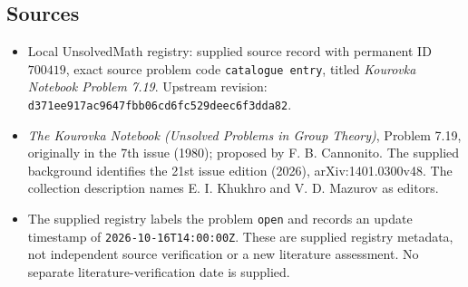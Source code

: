 \documentclass[11pt]{article}
\begin{document}
\subsection{Sources}
\begin{itemize}
\item Local UnsolvedMath registry: supplied source record with permanent ID \(700419\), exact source problem code \texttt{catalogue entry}, titled \emph{Kourovka Notebook Problem 7.19}. Upstream revision: \texttt{d371ee917ac9647fbb06cd6fc529deec6f3dda82}.
\item \emph{The Kourovka Notebook (Unsolved Problems in Group Theory)}, Problem 7.19, originally in the 7th issue (1980); proposed by F. B. Cannonito. The supplied background identifies the 21st issue edition (2026), arXiv:1401.0300v48. The collection description names E. I. Khukhro and V. D. Mazurov as editors.
\item The supplied registry labels the problem \texttt{open} and records an update timestamp of \texttt{2026-10-16T14:00:00Z}. These are supplied registry metadata, not independent source verification or a new literature assessment. No separate literature-verification date is supplied.
\end{itemize}
\end{document}
